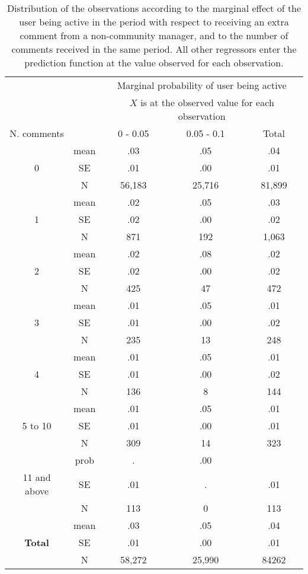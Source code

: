 \begin{table}[htbp]\centering
	\begin{tabular}{c c | c  c | c}
 		& & \multicolumn{3}{c}{Marginal probability of user being active} \\
		& & \multicolumn{3}{c}{$X$ is at the observed value for each observation} \\
		\hline
		N. comments& & 0 - 0.05&0.05 - 0.1&Total \\
		\hline
		& mean & .03 & .05 & .04 \\ 
		0 & SE & .01 & .00 & .01 \\
		& N & 56,183&25,716&81,899 \\
		\hline
		 & mean & .02 & .05 & .03 \\
		1 & SE & .02 & .00 & .02 \\
		&N&871 & 192 & 1,063 \\
		\hline
		& mean & .02 & .08 & .02 \\
		2 & SE & .02 & .00 &.02 \\
		& N& 425 & 47 & 472 \\
		\hline
		& mean & .01 & .05 & .01 \\
		3 & SE & .01 & .00 & .02 \\
		&N& 235 & 13 & 248\\
		\hline
		& mean & .01 & .05 & .01 \\
		4 & SE & .01 & .00 & .02 \\
		& N & 136 & 8 & 144 \\
		\hline
		& mean & .01 & .05 & .01  \\
		5 to 10 & SE & .01 & .00 & .01 \\
		& N&309&14& 323 \\
		\hline
		& prob & . & .00 \\
		11 and above & SE & .01 & . & .01\\
		& N &113 & 0 & 113\\
		\hline
		& mean & .03 & .05 & .04 \\
		\textbf{Total} & SE & .01 & .00 & .01\\
		& N & 58,272 & 25,990 & 84262 \\
		\hline
	\end{tabular}
	\caption{Distribution of the observations according to the marginal effect of the user being active in the period with respect to receiving an extra comment from a non-community manager, and to the number of comments received in the same period. All other regressors enter the prediction function at the value observed for each observation.}
	\label{tab:marginalProbabilityXurecObserved}
\end{table}


